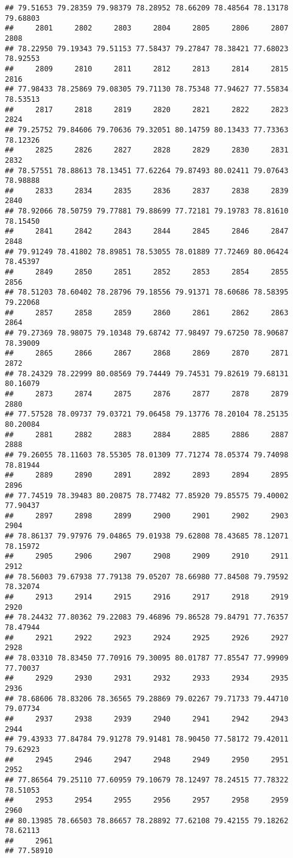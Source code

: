 \documentclass[
]{article}
\begin{document}
\begin{verbatim}
## 79.51653 79.28359 79.98379 78.28952 78.66209 78.48564 78.13178 79.68803 
##     2801     2802     2803     2804     2805     2806     2807     2808 
## 78.22950 79.19343 79.51153 77.58437 79.27847 78.38421 77.68023 78.92553 
##     2809     2810     2811     2812     2813     2814     2815     2816 
## 77.98433 78.25869 79.08305 79.71130 78.75348 77.94627 77.55834 78.53513 
##     2817     2818     2819     2820     2821     2822     2823     2824 
## 79.25752 79.84606 79.70636 79.32051 80.14759 80.13433 77.73363 78.12326 
##     2825     2826     2827     2828     2829     2830     2831     2832 
## 78.57551 78.88613 78.13451 77.62264 79.87493 80.02411 79.07643 78.98888 
##     2833     2834     2835     2836     2837     2838     2839     2840 
## 78.92066 78.50759 79.77881 79.88699 77.72181 79.19783 78.81610 78.15450 
##     2841     2842     2843     2844     2845     2846     2847     2848 
## 79.91249 78.41802 78.89851 78.53055 78.01889 77.72469 80.06424 78.45397 
##     2849     2850     2851     2852     2853     2854     2855     2856 
## 78.51203 78.60402 78.28796 79.18556 79.91371 78.60686 78.58395 79.22068 
##     2857     2858     2859     2860     2861     2862     2863     2864 
## 79.27369 78.98075 79.10348 79.68742 77.98497 79.67250 78.90687 78.39009 
##     2865     2866     2867     2868     2869     2870     2871     2872 
## 78.24329 78.22999 80.08569 79.74449 79.74531 79.82619 79.68131 80.16079 
##     2873     2874     2875     2876     2877     2878     2879     2880 
## 77.57528 78.09737 79.03721 79.06458 79.13776 78.20104 78.25135 80.20084 
##     2881     2882     2883     2884     2885     2886     2887     2888 
## 79.26055 78.11603 78.55305 78.01309 77.71274 78.05374 79.74098 78.81944 
##     2889     2890     2891     2892     2893     2894     2895     2896 
## 77.74519 78.39483 80.20875 78.77482 77.85920 79.85575 79.40002 77.90437 
##     2897     2898     2899     2900     2901     2902     2903     2904 
## 78.86137 79.97976 79.04865 79.01938 79.62808 78.43685 78.12071 78.15972 
##     2905     2906     2907     2908     2909     2910     2911     2912 
## 78.56003 79.67938 77.79138 79.05207 78.66980 77.84508 79.79592 78.32074 
##     2913     2914     2915     2916     2917     2918     2919     2920 
## 78.24432 77.80362 79.22083 79.46896 79.86528 79.84791 77.76357 78.47944 
##     2921     2922     2923     2924     2925     2926     2927     2928 
## 78.03310 78.83450 77.70916 79.30095 80.01787 77.85547 77.99909 77.70037 
##     2929     2930     2931     2932     2933     2934     2935     2936 
## 78.68606 78.83206 78.36565 79.28869 79.02267 79.71733 79.44710 79.07734 
##     2937     2938     2939     2940     2941     2942     2943     2944 
## 79.43933 77.84784 79.91278 79.91481 78.90450 77.58172 79.42011 79.62923 
##     2945     2946     2947     2948     2949     2950     2951     2952 
## 77.86564 79.25110 77.60959 79.10679 78.12497 78.24515 77.78322 78.51053 
##     2953     2954     2955     2956     2957     2958     2959     2960 
## 80.13985 78.66503 78.86657 78.28892 77.62108 79.42155 79.18262 78.62113 
##     2961 
## 77.58910
\end{verbatim}
\end{document}
